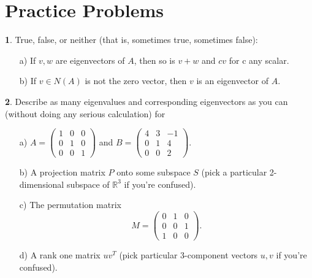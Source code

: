 \documentclass{article}
\theoremstyle{definition}
\newtheorem{prob}{}
\begin{document}
\section*{Practice Problems}
\begin{prob}
True, false, or neither (that is, sometimes true, sometimes false):
\begin{itemize}
	\item[a)] If $v, w$ are eigenvectors of $A$, then so is $v+w$ and $c v$ for c any scalar.
	\item[b)] If $v \in N(A)$ is not the zero vector, then $v$ is an eigenvector of $A$.
\end{itemize}
\end{prob}

%	

\begin{prob}
	Describe as many eigenvalues and corresponding eigenvectors as you can (without doing any serious calculation) for
	
	\begin{itemize}
		
		\item[a)] $A = \begin{pmatrix} 1 & 0 & 0 \\ 0 & 1 & 0 \\ 0 & 0 & 1 \end{pmatrix}$ and 
	$B = \begin{pmatrix} 4 & 3 & -1 \\ 0 & 1 & 4 \\ 0 & 0 &2 \end{pmatrix}$.
		
		\item[b)] A projection matrix $P$ onto some subspace $S$ (pick a particular 2-dimensional subspace of $\mathbb{R}^3$ if you're confused).
		
		\item[c)] The permutation matrix
		\[M = \begin{pmatrix} 0 & 1 & 0 \\ 0 & 0 & 1 \\ 1 & 0 & 0 \end{pmatrix}. \]
		
		\item[d)] A rank one matrix $uv^T$ (pick particular 3-component vectors $u, v$ if you're confused).
		
	\end{itemize}
\end{prob}
\end{document}
